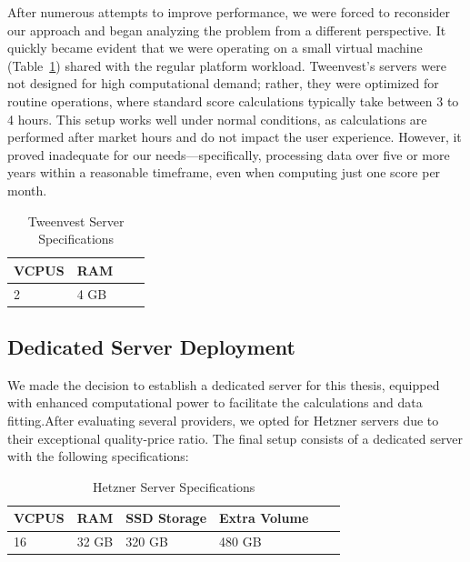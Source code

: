 \documentclass[11pt,english,a4paper,hidelinks]{book}
\begin{document}
\vspace{0.5cm}
\noindent After numerous attempts to improve performance, we were forced to reconsider our approach and began analyzing the problem from a different perspective. It quickly became evident that we were operating on a small virtual machine (Table~\ref{tab:tweenvest_server_specs}) shared with the regular platform workload. Tweenvest's servers were not designed for high computational demand; rather, they were optimized for routine operations, where standard score calculations typically take between 3 to 4 hours. This setup works well under normal conditions, as calculations are performed after market hours and do not impact the user experience. However, it proved inadequate for our needs—specifically, processing data over five or more years within a reasonable timeframe, even when computing just one score per month.

\begin{table}[H]
    \centering
    \begin{tabular}{|l|l|l|l|}
        \hline
        \textbf{VCPUS} & \textbf{RAM}  \\
        \hline
        2 & 4 GB  \\
        \hline
    \end{tabular}
    \caption{Tweenvest Server Specifications}
    \label{tab:tweenvest_server_specs}
\end{table}


\subsection{Dedicated Server Deployment}
\noindent We made the decision to establish a dedicated server for this thesis, equipped with enhanced computational power to facilitate the calculations and data fitting.After evaluating several providers, we opted for Hetzner servers due to their exceptional quality-price ratio. The final setup consists of a dedicated server with the following specifications:

\begin{table}[H]
    \centering
    \begin{tabular}{|l|l|l|l|l|l|}
        \hline
        \textbf{VCPUS} & \textbf{RAM} & \textbf{SSD Storage} & \textbf{Extra Volume} \\
        \hline
        16 & 32 GB & 320 GB & 480 GB \\
        \hline
    \end{tabular}
    \caption{Hetzner Server Specifications}
    \label{tab:hetzner_server_specs}
\end{table}
\end{document}
